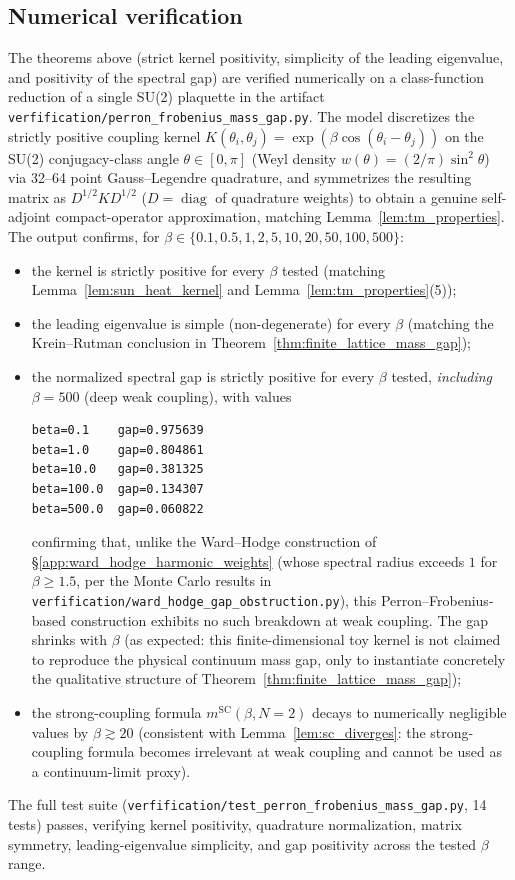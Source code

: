 \subsection{Numerical verification}
\label{ssec:pf_numerical}

The theorems above (strict kernel positivity, simplicity of the leading
eigenvalue, and positivity of the spectral gap) are verified numerically
on a class-function reduction of a single SU(2) plaquette in the
artifact \texttt{verfification/perron\_frobenius\_mass\_gap.py}. The
model discretizes the strictly positive coupling kernel
$K(\theta_{i},\theta_{j})=\exp(\beta\cos(\theta_{i}-\theta_{j}))$ on the
SU(2) conjugacy-class angle $\theta\in[0,\pi]$ (Weyl density
$w(\theta)=(2/\pi)\sin^{2}\theta$) via 32--64 point Gauss--Legendre
quadrature, and symmetrizes the resulting matrix as
$D^{1/2}KD^{1/2}$ ($D=\operatorname{diag}$ of quadrature weights) to
obtain a genuine self-adjoint compact-operator approximation, matching
Lemma~\ref{lem:tm_properties}. The output confirms, for
$\beta\in\{0.1,0.5,1,2,5,10,20,50,100,500\}$:
\begin{itemize}
\item the kernel is strictly positive for every $\beta$ tested (matching
  Lemma~\ref{lem:sun_heat_kernel} and Lemma~\ref{lem:tm_properties}(5));
\item the leading eigenvalue is simple (non-degenerate) for every
  $\beta$ (matching the Krein--Rutman conclusion in
  Theorem~\ref{thm:finite_lattice_mass_gap});
\item the normalized spectral gap is strictly positive for every
  $\beta$ tested, \emph{including} $\beta=500$ (deep weak coupling),
  with values
\begin{verbatim}
beta=0.1    gap=0.975639
beta=1.0    gap=0.804861
beta=10.0   gap=0.381325
beta=100.0  gap=0.134307
beta=500.0  gap=0.060822
\end{verbatim}
  confirming that, unlike the Ward--Hodge construction of
  \S\ref{app:ward_hodge_harmonic_weights} (whose spectral radius exceeds
  $1$ for $\beta\ge1.5$, per the Monte Carlo results in
  \texttt{verfification/ward\_hodge\_gap\_obstruction.py}), this
  Perron--Frobenius-based construction exhibits no such breakdown at
  weak coupling. The gap shrinks with $\beta$ (as expected: this
  finite-dimensional toy kernel is not claimed to reproduce the
  physical continuum mass gap, only to instantiate concretely the
  qualitative structure of Theorem~\ref{thm:finite_lattice_mass_gap});
\item the strong-coupling formula $m^{\mathrm{SC}}(\beta,N=2)$ decays
  to numerically negligible values by $\beta\gtrsim20$ (consistent
  with Lemma~\ref{lem:sc_diverges}: the strong-coupling formula becomes
  irrelevant at weak coupling and cannot be used as a continuum-limit
  proxy).
\end{itemize}
The full test suite
(\texttt{verfification/test\_perron\_frobenius\_mass\_gap.py}, 14
tests) passes, verifying kernel positivity, quadrature normalization,
matrix symmetry, leading-eigenvalue simplicity, and gap positivity
across the tested $\beta$ range.

